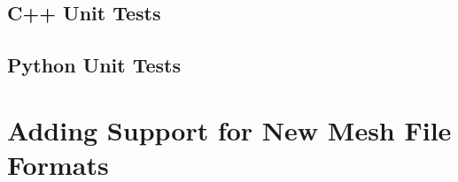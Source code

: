\subsection{C++ Unit Tests}

\subsection{Python Unit Tests}


\section{Adding Support for New Mesh File Formats}

